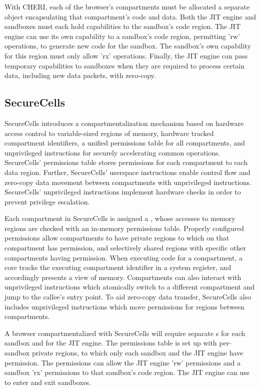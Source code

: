 With CHERI, each of the browser's compartments must be allocated a separate
object encapsulating that compartment's code and data.
Both the JIT engine and sandboxes must each hold capabilities to the
sandbox's code region. 
The JIT engine can use its own capability to a sandbox's code region,
permitting 'rw' operations, to generate new code for the sandbox.
The sandbox's own capability for this region must only allow 'rx' operations.
Finally, the JIT engine can pass temporary capabilities to sandboxes
when they are required to process certain data, including new data packets,
with zero-copy.

\subsection{SecureCells}
SecureCells introduces a compartmentalization mechanism based on hardware
access control to variable-sized regions of memory, hardware tracked
compartment identifiers, a unified permissions table for all compartments,
and unprivileged instructions for securely accelerating common operations.
SecureCells' permissions table stores permissions for each compartment to
each data region.
Further, SecureCells' userspace instructions enable control flow and
zero-copy data movement between compartments with unprivileged instructions.
SecureCells' unprivileged instructions implement hardware checks in order
to prevent privilege escalation.

Each compartment in SecureCells is assigned a \secdiv{}, whose accesses
to memory regions are checked with an in-memory permissions table.
Properly configured permissions allow compartments to have private regions
to which on that compartment has permission, and selectively shared regions
with specific other compartments having permission. 
When executing code for a compartment, a core tracks the executing compartment
identifier in a system register, and accordingly presents a view of memory.
Compartments can also interact with unprivileged  instructions
which atomically  switch to a different compartment and jump to the callee's
entry point.
To aid zero-copy data transfer, SecureCells also includes unprivileged instructions
which move permissions for regions between compartments.

A browser compartmentalized with SecureCells will require separate
\secdiv{}s for each sandbox and for the JIT engine.
The permissions table is set up with per-sandbox private regions, to which
only each sandbox and the JIT engine have permission.
The permissions can allow the JIT engine 'rw' permissions and a sandbox
'rx' permissions to that sandbox's code region.
The JIT engine can use  to enter and exit sandboxes.

